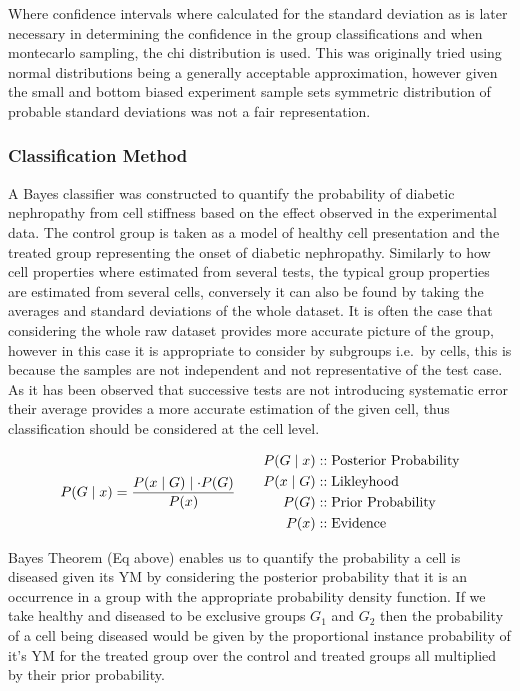 \documentclass[
  paper=a4,
  ,captions=tableheading
]{scrartcl}
\begin{document}
Where confidence intervals where calculated for the standard deviation
as is later necessary in determining the confidence in the group
classifications and when montecarlo sampling, the chi distribution is
used. This was originally tried using normal distributions being a
generally acceptable approximation, however given the small and bottom
biased experiment sample sets symmetric distribution of probable
standard deviations was not a fair representation.

\subsubsection{Classification Method}\label{classification-method}

A Bayes classifier was constructed to quantify the probability of
diabetic nephropathy from cell stiffness based on the effect observed in
the experimental data. The control group is taken as a model of healthy
cell presentation and the treated group representing the onset of
diabetic nephropathy. Similarly to how cell properties where estimated
from several tests, the typical group properties are estimated from
several cells, conversely it can also be found by taking the averages
and standard deviations of the whole dataset. It is often the case that
considering the whole raw dataset provides more accurate picture of the
group, however in this case it is appropriate to consider by subgroups
i.e.~by cells, this is because the samples are not independent and not
representative of the test case. As it has been observed that successive
tests are not introducing systematic error their average provides a more
accurate estimation of the given cell, thus classification should be
considered at the cell level.

\[
{\Large  
P(G \mid x) = \frac{P(x \mid G) \mid \cdot P(G)}{P(x)}  
}  
\qquad  
\begin{align}  
P(G \mid x) &:: \text{Posterior Probability}\\
P(x \mid G) &:: \text{Likleyhood}\\
P(G)   &:: \text{Prior Probability}\\
P(x)   &:: \text{Evidence}\\
\end{align}
\]

Bayes Theorem (Eq above) enables us to quantify the probability a cell
is diseased given its YM by considering the posterior probability that
it is an occurrence in a group with the appropriate probability density
function. If we take healthy and diseased to be exclusive groups
\(G_{1}\) and \(G_{2}\) then the probability of a cell being diseased
would be given by the proportional instance probability of it's YM for
the treated group over the control and treated groups all multiplied by
their prior probability.
\end{document}

